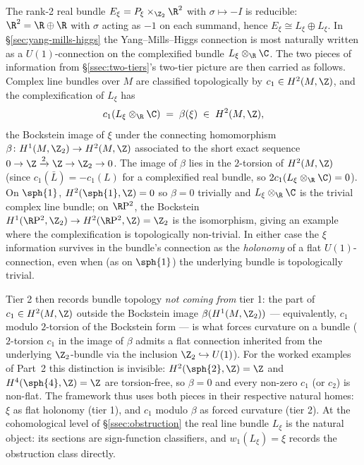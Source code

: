 \begin{remark}\label{rem:rank-2-deferred}
The rank-2 real bundle $E_\xi=P_\xi\times_{\Z_2}\R^2$ with
$\sigma\mapsto -I$ is reducible: $\R^2=\R\oplus\R$ with $\sigma$
acting as $-1$ on each summand, hence
$E_\xi\cong L_\xi\oplus L_\xi$. In \S\ref{sec:yang-mills-higgs} the
Yang--Mills--Higgs connection is most naturally written as a
$U(1)$-connection on the complexified bundle
$L_\xi\otimes_\R\C$. The two pieces of information from
\S\ref{ssec:two-tiers}'s two-tier picture are then carried as
follows. Complex line bundles over $M$ are classified topologically
by $c_1\in H^2(M,\Z)$, and the complexification of $L_\xi$ has
\[
   c_1(L_\xi\otimes_\R\C) \;=\; \beta(\xi) \;\in\; H^2(M,\Z),
\]
the Bockstein image of $\xi$ under the connecting homomorphism
$\beta\colon H^1(M,\Z_2)\to H^2(M,\Z)$ associated to the short exact
sequence $0\to\Z\xrightarrow{2}\Z\to\Z_2\to 0$. The image of $\beta$
lies in the $2$-torsion of $H^2(M,\Z)$ (since
$c_1(\bar L)=-c_1(L)$ for a complexified real bundle, so
$2 c_1(L_\xi\otimes_\R\C)=0$). On $\sph{1}$, $H^2(\sph{1},\Z)=0$ so
$\beta=0$ trivially and $L_\xi\otimes_\R\C$ is the trivial complex
line bundle; on $\R\mathrm{P}^2$, the Bockstein
$H^1(\R\mathrm{P}^2,\Z_2)\to H^2(\R\mathrm{P}^2,\Z)=\Z_2$ is the
isomorphism, giving an example where the complexification is
topologically non-trivial. In either case the $\xi$ information
survives in the bundle's connection as the \emph{holonomy} of a
flat $U(1)$-connection, even when (as on $\sph{1}$) the underlying
bundle is topologically trivial.

Tier 2 then records bundle topology \emph{not coming from} tier 1:
the part of $c_1\in H^2(M,\Z)$ outside the Bockstein image
$\beta(H^1(M,\Z_2))$ --- equivalently, $c_1$ modulo $2$-torsion of
the Bockstein form --- is what forces curvature on a bundle
($2$-torsion $c_1$ in the image of $\beta$ admits a flat connection
inherited from the underlying $\Z_2$-bundle via the inclusion
$\Z_2\hookrightarrow U(1)$). For the worked examples of Part~2
this distinction is invisible: $H^2(\sph{2},\Z)=\Z$ and
$H^4(\sph{4},\Z)=\Z$ are torsion-free, so $\beta=0$ and every
non-zero $c_1$ (or $c_2$) is non-flat. The framework thus uses
both pieces in their respective natural homes: $\xi$ as flat
holonomy (tier 1), and $c_1$ modulo $\beta$ as forced curvature
(tier 2). At the cohomological level of \S\ref{ssec:obstruction}
the real line bundle $L_\xi$ is the natural object: its sections
are sign-function classifiers, and $w_1(L_\xi)=\xi$ records the
obstruction class directly.
\end{remark}


